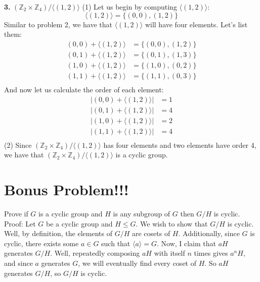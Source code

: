 \documentclass{article}
\begin{document}
\textbf{3.} $(\mathbb{Z}_2 \times \mathbb{Z}_4)/\langle (1,2) \rangle$
\newline
(1) Let us begin by computing $\langle (1,2) \rangle$:
\[\langle (1,2) \rangle = \{(0,0), (1,2)\}\]
Similar to problem 2, we have that $\langle (1,2) \rangle$ will have four elements. Let's list them:
\begin{align*}
    (0,0) + \langle (1,2) \rangle &= \{(0,0), (1,2)\} \\
    (0,1) + \langle (1,2) \rangle &= \{(0,1), (1,3)\} \\
    (1,0) + \langle (1,2) \rangle &= \{(1,0), (0,2)\} \\
    (1,1) + \langle (1,2) \rangle &= \{(1,1), (0,3)\} \\
\end{align*}
And now let us calculate the order of each element:
\begin{align*}
    \left| (0,0) + \langle (1,2) \rangle \right| &= 1 \\
    \left| (0,1) + \langle (1,2) \rangle \right| &= 4 \\
    \left| (1,0) + \langle (1,2) \rangle \right| &= 2 \\
    \left| (1,1) + \langle (1,2) \rangle \right| &= 4 \\
\end{align*}
(2) Since $(\mathbb{Z}_2 \times \mathbb{Z}_4)/\langle (1,2) \rangle$ has four elements and two elements have order 4, we have that $(\mathbb{Z}_2 \times \mathbb{Z}_4)/\langle (1,2) \rangle$ is a cyclic group.

\section*{Bonus Problem!!!}

Prove if $G$ is a cyclic group and $H$ is any subgroup of $G$ then $G/H$ is cyclic.
\newline\newline
Proof: Let $G$ be a cyclic group and $H \leq G$. We wish to show that $G/H$ is cyclic. Well, by definition, the elements of $G/H$ are cosets of $H$. Additionally, since $G$ is cyclic, there exists some $a \in G$ such that $\langle a \rangle = G$. Now, I claim that $aH$ generates $G/H$. Well, repeatedly composing $aH$ with itself $n$ times gives $a^nH$, and since $a$ generates $G$, we will eventually find every coset of $H$. So $aH$ generates $G/H$, so $G/H$ is cyclic.  
\end{document}
